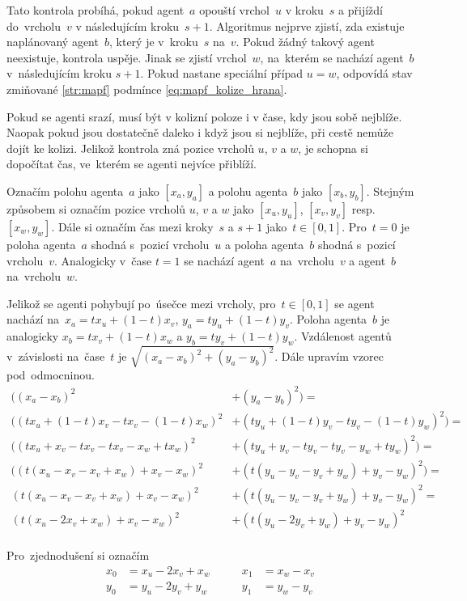 Tato kontrola probíhá, pokud agent~$a$ opouští vrchol~$u$ v kroku~$s$ a přijíždí do~vrcholu~$v$ v následujícím kroku~$s + 1$.
Algoritmus nejprve zjistí, zda existuje naplánovaný agent~$b$, který je v~kroku~$s$ na~$v$.
Pokud žádný takový agent neexistuje, kontrola uspěje.
Jinak se zjistí vrchol~$w$, na~kterém se nachází agent~$b$ v~následujícím kroku $s + 1$.
Pokud nastane speciální případ $u=w$, odpovídá stav zmiňované \ref{str:mapf} podmínce \eqref{eq:mapf_kolize_hrana}.

Pokud se agenti srazí, musí být v kolizní poloze i v čase, kdy jsou sobě nejblíže.
Naopak pokud jsou dostatečně daleko i když jsou si nejblíže, při cestě nemůže dojít ke kolizi.
Jelikož kontrola zná pozice vrcholů $u$, $v$ a $w$, je schopna si dopočítat čas, ve~kterém se agenti nejvíce přiblíží.

Označím polohu agenta~$a$ jako $[x_a, y_a]$ a polohu agenta~$b$ jako $[x_b, y_b]$.
Stejným způsobem si označím pozice vrcholů $u$, $v$ a $w$ jako $[x_u, y_u]$, $[x_v, y_v]$ resp. $[x_w, y_w]$.
Dále si označím čas mezi kroky~$s$ a $s + 1$ jako~$t\in[0, 1]$.
Pro~$t = 0$ je poloha agenta~$a$ shodná s~pozicí vrcholu~$u$ a poloha agenta~$b$ shodná s~pozicí vrcholu~$v$.
Analogicky v~čase $t = 1$ se nachází agent~$a$ na~vrcholu~$v$ a agent~$b$ na~vrcholu~$w$.

Jelikož se agenti pohybují po~úsečce mezi vrcholy,
pro~$t\in[0, 1]$ se agent nachází na~$x_a = tx_u + (1 - t)x_v$, $y_a = ty_u + (1 - t)y_v$.
Poloha agenta~$b$ je analogicky $x_b = tx_v + (1 - t)x_w$ a $y_b = ty_v + (1 - t)y_w$.
Vzdálenost agentů v~závislosti na~čase~$t$ je $\sqrt{(x_a - x_b)^2 + (y_a - y_b)^2}$.
Dále upravím vzorec pod~odmocninou.
\begin{align*}
  ((x_a - x_b)^2 &+ (y_a - y_b)^2) = \\
  ((tx_u + (1 - t)x_v - tx_v - (1 - t)x_w)^2 &+ (ty_u + (1 - t)y_v - ty_v - (1 - t)y_w)^2) = \\
  ((tx_u + x_v - tx_v - tx_v - x_w + tx_w)^2 &+ (ty_u + y_v - ty_v - ty_v - y_w + ty_w)^2) = \\
  ((t(x_u - x_v - x_v + x_w) + x_v - x_w)^2 &+ (t(y_u - y_v - y_v + y_w) + y_v - y_w)^2) = \\
  (t(x_u - x_v - x_v + x_w) + x_v - x_w)^2 &+ (t(y_u - y_v - y_v + y_w) + y_v - y_w)^2 = \\
  (t(x_u - 2x_v + x_w) + x_v - x_w)^2 &+ (t(y_u - 2y_v + y_w) + y_v - y_w)^2 \\
\end{align*}

Pro~zjednodušení si označím
\begin{align*}
  x_0 &= x_u - 2x_v + x_w &\qquad
  x_1 &= x_w - x_v \\
  y_0 &= y_u - 2y_v + y_w &\qquad
  y_1 &= y_w - y_v
\end{align*}


